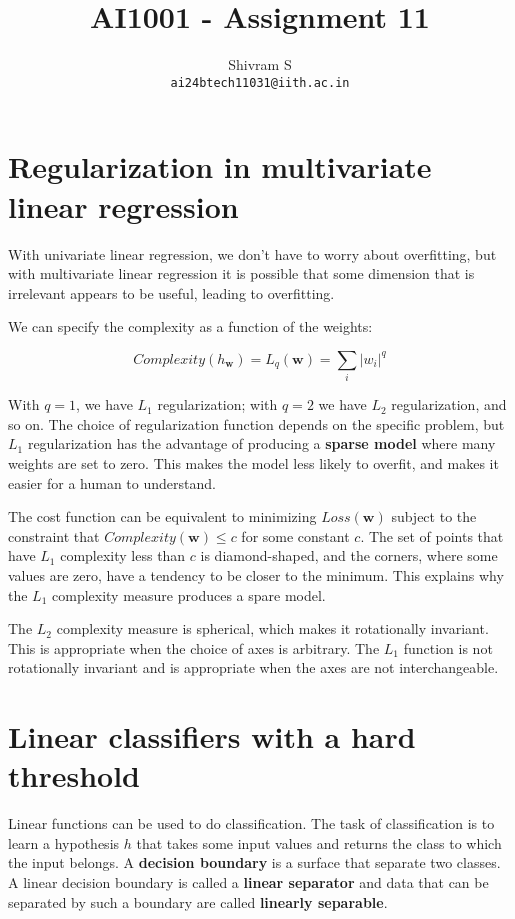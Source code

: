 \documentclass{article}
\author{Shivram S \\ \texttt{ai24btech11031@iith.ac.in}}
\title{AI1001 - Assignment 11}
\begin{document}
\maketitle

\section{Regularization in multivariate linear regression}

With univariate linear regression, we don't have to worry about overfitting, but with
multivariate linear regression it is possible that some dimension that is irrelevant
appears to be useful, leading to overfitting.

We can specify the complexity as a function of the weights:

\[
Complexity(h_{\textbf{w}}) = L_q(\textbf{w}) = \sum_i \lvert w_i \rvert^q
\]

With $q = 1$, we have $L_1$ regularization; with $q = 2$ we have $L_2$ regularization,
and so on. The choice of regularization function depends on the specific problem, but
$L_1$ regularization has the advantage of producing a \textbf{sparse model} where many
weights are set to zero. This makes the model less likely to overfit, and makes it
easier for a human to understand.

The cost function can be equivalent to minimizing $Loss(\textbf{w})$ subject to the
constraint that $Complexity(\textbf{w}) \le c$ for some constant $c$. The set of points
that have $L_1$ complexity less than $c$ is diamond-shaped, and the corners, where some
values are zero, have a tendency to be closer to the minimum. This explains why the
$L_1$ complexity measure produces a spare model. 

The $L_2$ complexity measure is spherical, which makes it rotationally invariant.
This is appropriate when the choice of axes is arbitrary. The $L_1$ function is not
rotationally invariant and is appropriate when the axes are not interchangeable.

\section{Linear classifiers with a hard threshold}

Linear functions can be used to do classification. The task of classification is to
learn a hypothesis $h$ that takes some input values and returns the class to which
the input belongs. A \textbf{decision boundary} is a surface that separate two classes.
A linear decision boundary is called a \textbf{linear separator} and data that can
be separated by such a boundary are called \textbf{linearly separable}.
\end{document}
